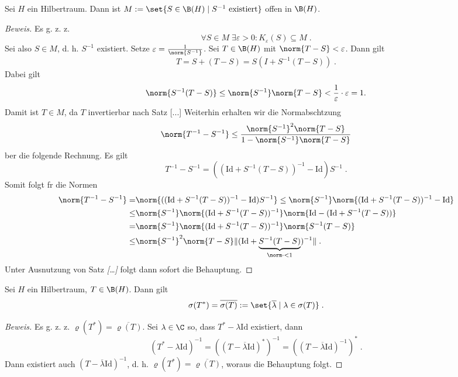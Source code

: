 \begin{theorem}
	Sei $H$ ein Hilbertraum. Dann ist \( M:= \set{S \in \B(H) \;\vert\; S^{-1} \text{ existiert}}\) offen in \(\B(H)\). \label{invertible_bounded_operators_open}
\end{theorem}
\begin{proof}[Beweis]
	Es g. z. z. 
	\[\forall S \in M \;\exists \varepsilon > 0: K_\varepsilon(S) \subseteq M\;.\]
	Sei also $S\in M$, d. h. \(S^{-1}\) existiert. Setze \(\varepsilon = \frac{1}{\norm{S^{-1}}}\). Sei \(T\in \B(H)\) mit \(\norm{T-S} < \varepsilon\).
	Dann gilt
	\[T = S + (T-S) = S (I + S^{-1}(T-S))\;.\]
	Dabei gilt 
	\[\norm{S^{-1}(T-S)} \leq \norm{S^{-1}}\norm{T-S} < \frac 1\varepsilon\cdot \varepsilon =1.\]
	Damit ist \(T\in M\), da $T$ invertierbar nach Satz [...] 
	Weiterhin erhalten wir die Normabsch\as tzung
	\[\norm{T^{-1} - S^{-1}} \leq \frac{\norm{S^{-1}}^2\norm{T-S}}{1-\norm{S^{-1}}\norm{T-S}}\]
	\us ber die folgende Rechnung. Es gilt 
	\[T^{-1} - S^{-1} = ((\text{Id} +S^{-1}(T-S))^{-1}-\text{Id})S^{-1}\;.\]
	Somit folgt f\us r die Normen
	\begin{align*}
	 	\norm{T^{-1} - S^{-1}} = &\norm{((\text{Id} +S^{-1}(T-S))^{-1}-\text{Id})S^{-1}} \leq \norm{S^{-1}} \norm{(\text{Id} +S^{-1}(T-S))^{-1}-\text{Id}} \\
	 	\leq &\norm{S^{-1}} \norm{(\text{Id} +S^{-1}(T-S))^{-1}} \norm{\text{Id} - (\text{Id} +S^{-1}(T-S))}\\
	 	= & \norm{S^{-1}} \norm{(\text{Id} +S^{-1}(T-S))^{-1}} \norm{S^{-1}(T-S)}\\
	 	\leq &  \norm{S^{-1}}^2 \norm{T-S} \lVert (\text{Id} +\underbrace{S^{-1}(T-S)}_{\norm\cdot < 1})^{-1}\rVert \;.
	\end{align*}
		Unter Ausnutzung von Satz \textit{[\ldots]} folgt dann sofort die Behauptung.
	\end{proof}
	
	\begin{theorem}
		Sei $H$ ein Hilbertraum, \(T \in \B(H)\). Dann gilt 
		\[\sigma(T^*) = \overline{\sigma(T)} := \set{\overline{\lambda}\;\vert\; \lambda \in \sigma(T)}\;.\]
	\end{theorem}
	\begin{proof}[Beweis]
		Es g. z. z. \(\varrho(T^*) = \overline{\varrho(T)}\). Sei \(\lambda \in \C\) so, dass \(T^*-\lambda\text{Id}\) existiert, dann
		\[(T^* - \lambda \text{Id})^{-1} = ((T-\overline{\lambda}\text{Id})^*)^{-1} = \left((T-\overline{\lambda}\text{Id})^{-1}\right)^*\;. \]
		Dann existiert auch \((T-\overline{\lambda}\text{Id})^{-1}\), d. h. \(\varrho(T^*) = \overline{\varrho(T)}\), woraus die Behauptung folgt.
	\end{proof}
	
